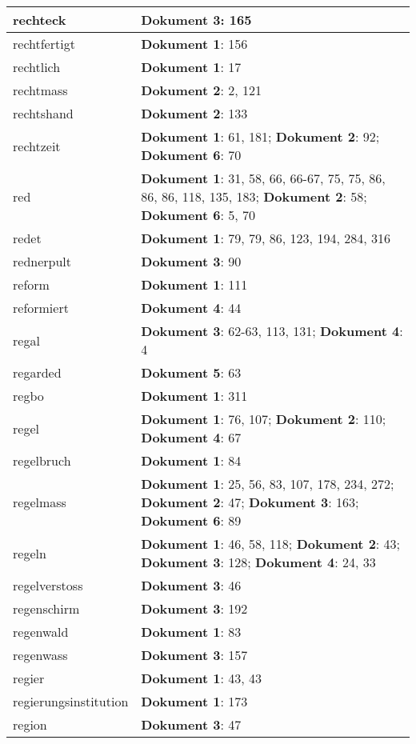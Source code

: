 \documentclass[a5paper]{article}
\begin{document}
\begin{longtable}[l]{|l|p{3in}|}
\hline
rechteck & \textbf{Dokument 3}: 165 \\
\hline
rechtfertigt & \textbf{Dokument 1}: 156 \\
\hline
rechtlich & \textbf{Dokument 1}: 17 \\
\hline
rechtmass & \textbf{Dokument 2}: 2, 121 \\
\hline
rechtshand & \textbf{Dokument 2}: 133 \\
\hline
rechtzeit & \textbf{Dokument 1}: 61, 181; \textbf{Dokument 2}: 92; \textbf{Dokument 6}: 70 \\
\hline
red & \textbf{Dokument 1}: 31, 58, 66, 66-67, 75, 75, 86, 86, 86, 118, 135, 183; \textbf{Dokument 2}: 58; \textbf{Dokument 6}: 5, 70 \\
\hline
redet & \textbf{Dokument 1}: 79, 79, 86, 123, 194, 284, 316 \\
\hline
rednerpult & \textbf{Dokument 3}: 90 \\
\hline
reform & \textbf{Dokument 1}: 111 \\
\hline
reformiert & \textbf{Dokument 4}: 44 \\
\hline
regal & \textbf{Dokument 3}: 62-63, 113, 131; \textbf{Dokument 4}: 4 \\
\hline
regarded & \textbf{Dokument 5}: 63 \\
\hline
regbo & \textbf{Dokument 1}: 311 \\
\hline
regel & \textbf{Dokument 1}: 76, 107; \textbf{Dokument 2}: 110; \textbf{Dokument 4}: 67 \\
\hline
regelbruch & \textbf{Dokument 1}: 84 \\
\hline
regelmass & \textbf{Dokument 1}: 25, 56, 83, 107, 178, 234, 272; \textbf{Dokument 2}: 47; \textbf{Dokument 3}: 163; \textbf{Dokument 6}: 89 \\
\hline
regeln & \textbf{Dokument 1}: 46, 58, 118; \textbf{Dokument 2}: 43; \textbf{Dokument 3}: 128; \textbf{Dokument 4}: 24, 33 \\
\hline
regelverstoss & \textbf{Dokument 3}: 46 \\
\hline
regenschirm & \textbf{Dokument 3}: 192 \\
\hline
regenwald & \textbf{Dokument 1}: 83 \\
\hline
regenwass & \textbf{Dokument 3}: 157 \\
\hline
regier & \textbf{Dokument 1}: 43, 43 \\
\hline
regierungsinstitution & \textbf{Dokument 1}: 173 \\
\hline
region & \textbf{Dokument 3}: 47 \\

\end{longtable}
\end{document}
